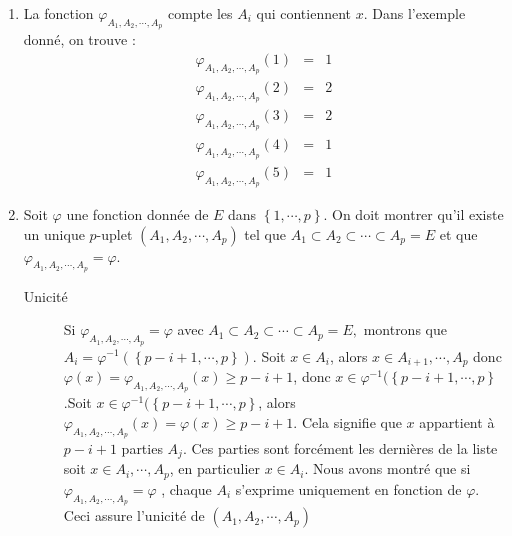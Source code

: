 \begin{enumerate}
\item  La fonction $\varphi _{A_{1},A_{2},\cdots ,A_{p}}$ compte les $A_{i}$
qui contiennent $x$. Dans l'exemple donn{\'e}, on trouve :
\begin{eqnarray*}
\varphi _{A_{1},A_{2},\cdots ,A_{p}}(1) &=&1 \\
\varphi _{A_{1},A_{2},\cdots ,A_{p}}(2) &=&2 \\
\varphi _{A_{1},A_{2},\cdots ,A_{p}}(3) &=&2 \\
\varphi _{A_{1},A_{2},\cdots ,A_{p}}(4) &=&1 \\
\varphi _{A_{1},A_{2},\cdots ,A_{p}}(5) &=&1
\end{eqnarray*}

\item  Soit $\varphi $ une fonction donn{\'e}e de $E$ dans $\left\{ 1,\cdots
,p\right\} $. On doit montrer qu'il existe un unique $p$-uplet $%
(A_{1},A_{2},\cdots ,A_{p})$ tel que $A_{1}\subset A_{2}\subset
\cdots \subset A_{p}=E$ et que $\varphi _{A_{1},A_{2},\cdots
,A_{p}}=\varphi $.

\begin{description}
\item[Unicit{\'e}]  Si $\varphi _{A_{1},A_{2},\cdots ,A_{p}}=\varphi $ avec $%
A_{1}\subset A_{2}\subset \cdots \subset A_{p}=E,$ montrons que $%
A_{i}=\varphi ^{-1}(\left\{ p-i+1,\cdots ,p\right\} )$.\newline
Soit $x\in A_{i}$, alors $x\in A_{i+1},\cdots ,A_{p}$ donc
$\varphi (x)=\varphi _{A_{1},A_{2},\cdots ,A_{p}}(x)\geq p-i+1$,
donc $x\in \varphi ^{-1}(\left\{ p-i+1,\cdots ,p\right\}
$.\newline Soit $x\in \varphi ^{-1}(\left\{ p-i+1,\cdots
,p\right\} $, alors $\varphi _{A_{1},A_{2},\cdots
,A_{p}}(x)=\varphi (x)\geq p-i+1$. Cela signifie que $x$
appartient {\`a} $p-i+1$ parties $A_{j}$. Ces parties sont forc{\'e}ment
les
derni{\`e}res de la liste soit $x\in A_{i},\cdots ,A_{p}$, en particulier $%
x\in A_{i}$.\newline
Nous avons montr{\'e} que si $\varphi _{A_{1},A_{2},\cdots ,A_{p}}=\varphi $%
, chaque $A_{i}$ s'exprime uniquement en fonction de $\varphi $.
Ceci assure l'unicit{\'e} de $(A_{1},A_{2},\cdots ,A_{p})$


\end{description}
\end{enumerate}
